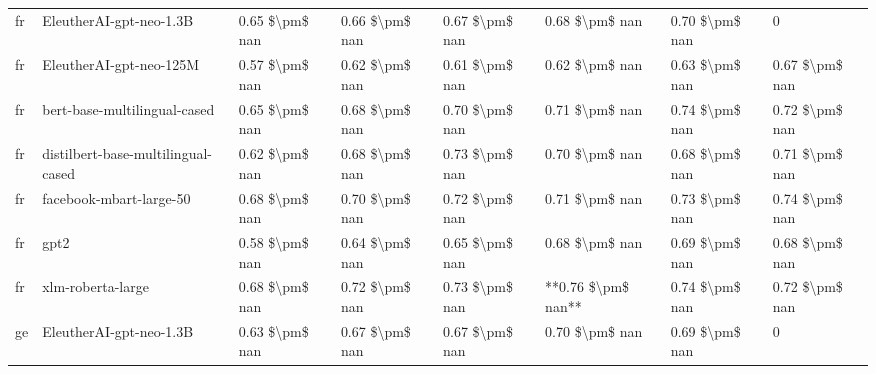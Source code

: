 \begin{tabular}{llllllll}
      fr &            EleutherAI-gpt-neo-1.3B & 0.65 \$\textbackslash pm\$ nan &            0.66 \$\textbackslash pm\$ nan &        0.67 \$\textbackslash pm\$ nan &         0.68 \$\textbackslash pm\$ nan &                          0.70 \$\textbackslash pm\$ nan &                  0 \\
      fr &            EleutherAI-gpt-neo-125M & 0.57 \$\textbackslash pm\$ nan &            0.62 \$\textbackslash pm\$ nan &        0.61 \$\textbackslash pm\$ nan &         0.62 \$\textbackslash pm\$ nan &                          0.63 \$\textbackslash pm\$ nan &     0.67 \$\textbackslash pm\$ nan \\
      fr &       bert-base-multilingual-cased & 0.65 \$\textbackslash pm\$ nan &            0.68 \$\textbackslash pm\$ nan &        0.70 \$\textbackslash pm\$ nan &         0.71 \$\textbackslash pm\$ nan &                          0.74 \$\textbackslash pm\$ nan &     0.72 \$\textbackslash pm\$ nan \\
      fr & distilbert-base-multilingual-cased & 0.62 \$\textbackslash pm\$ nan &            0.68 \$\textbackslash pm\$ nan &        0.73 \$\textbackslash pm\$ nan &         0.70 \$\textbackslash pm\$ nan &                          0.68 \$\textbackslash pm\$ nan &     0.71 \$\textbackslash pm\$ nan \\
      fr &            facebook-mbart-large-50 & 0.68 \$\textbackslash pm\$ nan &            0.70 \$\textbackslash pm\$ nan &        0.72 \$\textbackslash pm\$ nan &         0.71 \$\textbackslash pm\$ nan &                          0.73 \$\textbackslash pm\$ nan &     0.74 \$\textbackslash pm\$ nan \\
      fr &                               gpt2 & 0.58 \$\textbackslash pm\$ nan &            0.64 \$\textbackslash pm\$ nan &        0.65 \$\textbackslash pm\$ nan &         0.68 \$\textbackslash pm\$ nan &                          0.69 \$\textbackslash pm\$ nan &     0.68 \$\textbackslash pm\$ nan \\
      fr &                  xlm-roberta-large & 0.68 \$\textbackslash pm\$ nan &            0.72 \$\textbackslash pm\$ nan &        0.73 \$\textbackslash pm\$ nan &     **0.76 \$\textbackslash pm\$ nan** &                          0.74 \$\textbackslash pm\$ nan &     0.72 \$\textbackslash pm\$ nan \\
      ge &            EleutherAI-gpt-neo-1.3B & 0.63 \$\textbackslash pm\$ nan &            0.67 \$\textbackslash pm\$ nan &        0.67 \$\textbackslash pm\$ nan &         0.70 \$\textbackslash pm\$ nan &                          0.69 \$\textbackslash pm\$ nan &                  0 \\

\end{tabular}
